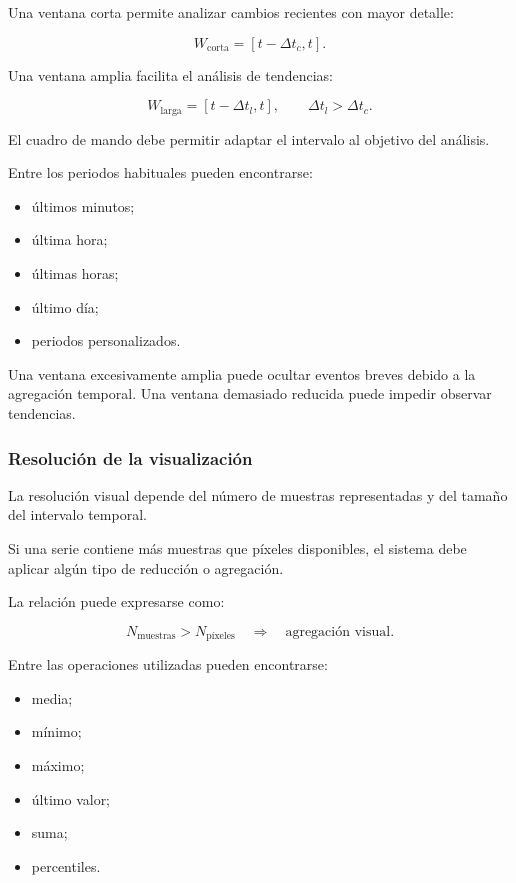 Una ventana corta permite analizar cambios recientes con mayor detalle:

\[
    W_{\mathrm{corta}}
    =
    [
        t-\Delta t_c,
        t
    ].
\]

Una ventana amplia facilita el análisis de tendencias:

\[
    W_{\mathrm{larga}}
    =
    [
        t-\Delta t_l,
        t
    ],
    \qquad
    \Delta t_l
    >
    \Delta t_c.
\]

El cuadro de mando debe permitir adaptar el intervalo al objetivo del
análisis.

Entre los periodos habituales pueden encontrarse:

\begin{itemize}
    \item últimos minutos;

    \item última hora;

    \item últimas horas;

    \item último día;

    \item periodos personalizados.
\end{itemize}

Una ventana excesivamente amplia puede ocultar eventos breves debido a
la agregación temporal. Una ventana demasiado reducida puede impedir
observar tendencias.


\subsubsection*{Resolución de la visualización}

La resolución visual depende del número de muestras representadas y del
tamaño del intervalo temporal.

Si una serie contiene más muestras que píxeles disponibles, el sistema
debe aplicar algún tipo de reducción o agregación.

La relación puede expresarse como:

\[
    N_{\mathrm{muestras}}
    >
    N_{\mathrm{píxeles}}
    \quad
    \Longrightarrow
    \quad
    \text{agregación visual}.
\]

Entre las operaciones utilizadas pueden encontrarse:

\begin{itemize}
    \item media;

    \item mínimo;

    \item máximo;

    \item último valor;

    \item suma;

    \item percentiles.
\end{itemize}

